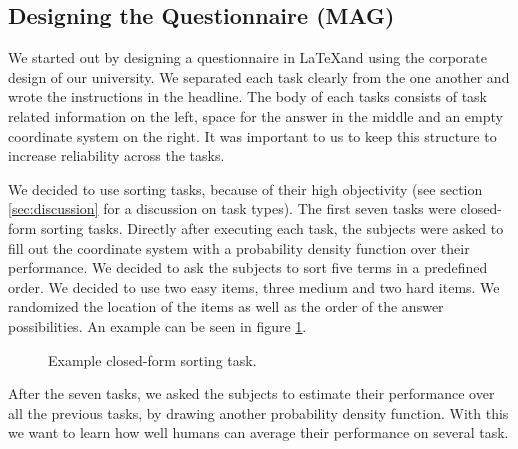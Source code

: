\documentclass[../main/main.tex]{subfiles}
\begin{document}
	
	
	\subsection{Designing the Questionnaire (MAG)}
	
	We started out by designing a questionnaire in \LaTeX and using the corporate design of our university. We separated each task clearly from the one another and wrote the instructions in the headline. The body of each tasks consists of task related information on the left, space for the answer in the middle and an empty coordinate system on the right. It was important to us to keep this structure to increase reliability across the tasks.
	
	We decided to use sorting tasks, because of their high objectivity (see section \ref{sec:discussion} for a discussion on task types). The first seven tasks were closed-form sorting tasks. Directly after executing each task, the subjects were asked to fill out the coordinate system with a probability density function over their performance. We decided to ask the subjects to sort five terms in a predefined order. We decided to use two easy items, three medium and two hard items. We randomized the location of the items as well as the order of the answer possibilities. An example can be seen in figure \ref{fig:example-task}.
	
	\begin{figure}[h]

		\centering
		\captionsetup{justification=centering}
		\caption{Example closed-form sorting task.}
		\label{fig:example-task}
	\end{figure} 
	
	After the seven tasks, we asked the subjects to estimate their performance over all the previous tasks, by drawing another probability density function. With this we want to learn how well humans can average their performance on several task. 
		
\end{document}
